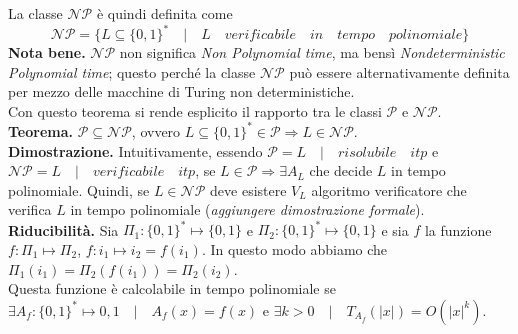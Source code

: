 \documentclass[a4paper,portrait,12pt]{article}
\theoremstyle{definition}
\begin{document}
La classe $\mathcal{NP}$ è quindi definita come
\begin{equation}
\mathcal{NP} = \{L \subseteq \{0,1\}^* \quad |\quad L \quad verificabile \quad in \quad tempo \quad polinomiale\}
\end{equation}
\textbf{Nota bene.} $\mathcal{NP}$ non significa \textit{Non Polynomial time}, ma bensì \textit{Nondeterministic 
Polynomial time}; questo perché la classe $\mathcal{NP}$ può essere alternativamente definita per mezzo delle
macchine di Turing non deterministiche.\\

Con questo teorema si rende esplicito il rapporto tra le classi $\mathcal{P}$ e $\mathcal{NP}$.\\
\textbf{Teorema.} $\mathcal{P} \subseteq \mathcal{NP}$, ovvero $L \subseteq \{0,1\}^* \in \mathcal{P} \Rightarrow 
L \in \mathcal{NP}$.\\

\textbf{Dimostrazione.} Intuitivamente, essendo $\mathcal{P} = {L \quad | \quad risolubile \quad itp}$ e 
$\mathcal{NP} = {L \quad | \quad verificabile \quad itp}$, se $L \in \mathcal{P} \Rightarrow \exists A_L$ che
decide $L$ in tempo polinomiale. Quindi, se $L \in \mathcal{NP}$ deve esistere $V_L$ algoritmo verificatore che
verifica $L$ in tempo polinomiale (\textit{aggiungere dimostrazione formale}).\\

\textbf{Riducibilità.} Sia $\Pi_1 : \{0,1\}^* \mapsto \{0,1\}$ e $\Pi_2 : \{0,1\}^* \mapsto \{0,1\}$ e sia $f$ la 
funzione $f : \Pi_1 \mapsto \Pi_2$, $f : i_1 \mapsto i_2 = f(i_1)$. In questo modo abbiamo che $\Pi_1 (i_1) = 
\Pi_2 (f(i_1)) = \Pi_2 (i_2)$.\\
Questa funzione è calcolabile in tempo polinomiale se $\exists A_f : \{0,1\}^* \mapsto {0,1} \quad | \quad 
A_f(x) = f(x)$ e $\exists k > 0 \quad | \quad T_{A_f} (\left|x\right|) = O(\left|x\right|^k)$.
\end{document}
